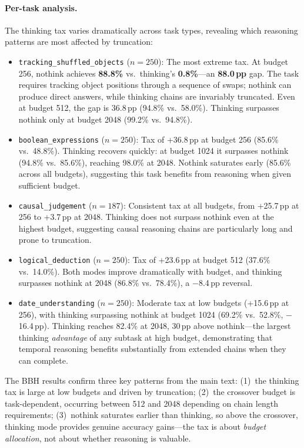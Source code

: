 \paragraph{Per-task analysis.}
The thinking tax varies dramatically across task types, revealing which reasoning patterns are most affected by truncation:
\begin{itemize}[nosep,leftmargin=*]
\item \texttt{tracking\_shuffled\_objects} ($n{=}250$): The most extreme tax.
  At budget 256, nothink achieves \textbf{88.8\%} vs.\ thinking's \textbf{0.8\%}---an
  \textbf{88.0\,pp} gap. The task requires tracking object positions through a
  sequence of swaps; nothink can produce direct answers, while thinking chains
  are invariably truncated. Even at budget 512, the gap is 36.8\,pp (94.8\% vs.\ 58.0\%).
  Thinking surpasses nothink only at budget 2048 (99.2\% vs.\ 94.8\%).
\item \texttt{boolean\_expressions} ($n{=}250$): Tax of +36.8\,pp at budget 256
  (85.6\% vs.\ 48.8\%). Thinking recovers quickly: at budget 1024 it surpasses
  nothink (94.8\% vs.\ 85.6\%), reaching 98.0\% at 2048. Nothink saturates
  early (85.6\% across all budgets), suggesting this task benefits from reasoning
  when given sufficient budget.
\item \texttt{causal\_judgement} ($n{=}187$): Consistent tax at all budgets,
  from +25.7\,pp at 256 to +3.7\,pp at 2048. Thinking does not surpass nothink
  even at the highest budget, suggesting causal reasoning chains are particularly
  long and prone to truncation.
\item \texttt{logical\_deduction} ($n{=}250$): Tax of +23.6\,pp at budget 512
  (37.6\% vs.\ 14.0\%). Both modes improve dramatically with budget, and thinking
  surpasses nothink at 2048 (86.8\% vs.\ 78.4\%), a $-$8.4\,pp reversal.
\item \texttt{date\_understanding} ($n{=}250$): Moderate tax at low budgets
  (+15.6\,pp at 256), with thinking surpassing nothink at budget 1024
  (69.2\% vs.\ 52.8\%, $-$16.4\,pp). Thinking reaches 82.4\% at 2048,
  30\,pp above nothink---the largest thinking \emph{advantage} of any subtask
  at high budget, demonstrating that temporal reasoning benefits substantially
  from extended chains when they can complete.
\end{itemize}

\noindent The BBH results confirm three key patterns from the main text:
(1)~the thinking tax is large at low budgets and driven by truncation;
(2)~the crossover budget is task-dependent, occurring between 512 and 2048
depending on chain length requirements;
(3)~nothink saturates earlier than thinking, so above the crossover, thinking
mode provides genuine accuracy gains---the tax is about \emph{budget allocation},
not about whether reasoning is valuable.

